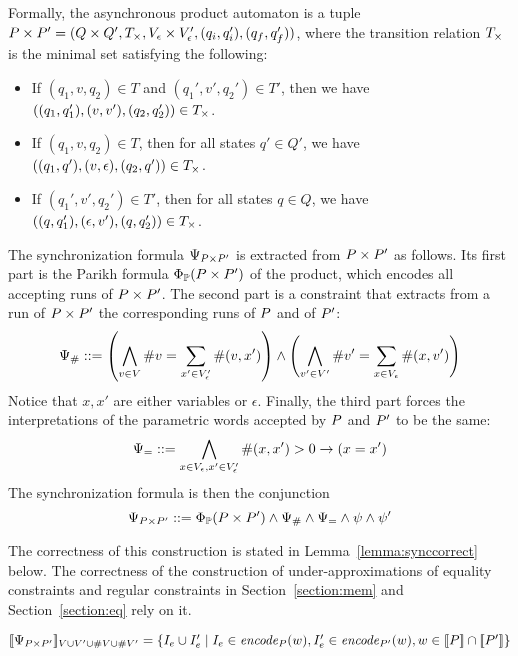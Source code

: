 \documentclass[sigplan,review,anonymous]{acmart}\settopmatter{printfolios=true,printccs=false,printacmref=false}
\begin{document}
Formally, the asynchronous product automaton is a tuple $P \times P' = (Q\times Q', T_\times, V_\epsilon \times V'_\epsilon, (q_i,q_i'),(q_f,q_f'))$, where the transition relation $T_\times$ is the minimal set satisfying the following:
%
\begin{itemize}
\item If $(q_1,v,q_2) \in T$ and $(q_1',v',q_2') \in T'$, then we have $((q_1,q_1'),(v,v'),(q_2,q_2'))\in T_\times$.

\smallskip

\item If $(q_1,v,q_2) \in T$, then for all states $q'\in Q'$, we have $((q_1,q'),(v,\epsilon),(q_2,q'))\in T_\times$.

\smallskip

\item If $(q_1',v',q_2') \in T'$, then for all states $q\in Q$, we have $((q,q_1'),(\epsilon,v'),(q,q_2'))\in T_\times$.
\end{itemize}	
%
The synchronization formula $\Psi_{P \times P'}$ is extracted from $P \times P'$ as follows.
Its first part is the Parikh formula $\Phi_{\mathbb{P}}(P \times P')$ of the product, which encodes all accepting runs of $P \times P'$.
%
The second part is a constraint that extracts from a run of $P \times P'$ the corresponding runs of $P$ and of $P'$:
$$ \Psi_{\#} ::= 
\left(\bigwedge_{v\in V}\#v = \sum_{x' \in V'_\epsilon} \#{(v,x')}\right)
\land
\left(\bigwedge_{v'\in V'} \#v' = \sum_{x \in V_\epsilon} \#{(x,v')}\right)
$$
Notice that $x,x'$ are either variables or $\epsilon$.
Finally, the third part forces the interpretations of the parametric words accepted by $P$ and $P'$ to be the same:
$$ \Psi_= ::=
\bigwedge_{x\in V_\epsilon,x'\in V'_\epsilon} \#(x,x')>0 \rightarrow (x=x')
$$
The synchronization formula is then the conjunction 
$$
\Psi_{P \times P'} ::= \Phi_{\mathbb{P}}(P \times P') \land \Psi_{\#} \land \Psi_= \land \psi \land \psi'
$$

The correctness of this construction is stated in Lemma~\ref{lemma:synccorrect} below. 
The correctness of the construction of under-approximations of equality constraints and regular constraints in Section~\ref{section:mem} and Section~\ref{section:eq} rely on it. 
%

\begin{lemma}\label{lemma:synccorrect}
$
[\![\Psi_{P \times P'}]\!]_{V\cup V' \cup \#{V}\cup\#{V'}} =
\{I_e\cup I_e'\mid I_e \in \mathit{encode}_{P} (w), I_e'\in\mathit{encode}_{P'} (w), w\in[\![P]\!] \cap [\![P']\!]\} 
$
\end{lemma}
\end{document}
